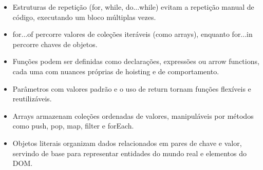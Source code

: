 \begin{itemize}
  \item Estruturas de repetição (for, while, do...while) evitam a repetição manual de código, executando um bloco múltiplas vezes.
\end{itemize}

\begin{itemize}
  \item for...of percorre valores de coleções iteráveis (como arrays), enquanto for...in percorre chaves de objetos.
\end{itemize}

\begin{itemize}
  \item Funções podem ser definidas como declarações, expressões ou arrow functions, cada uma com nuances próprias de hoisting e de comportamento.
\end{itemize}

\begin{itemize}
  \item Parâmetros com valores padrão e o uso de return tornam funções flexíveis e reutilizáveis.
\end{itemize}

\begin{itemize}
  \item Arrays armazenam coleções ordenadas de valores, manipuláveis por métodos como push, pop, map, filter e forEach.
\end{itemize}

\begin{itemize}
  \item Objetos literais organizam dados relacionados em pares de chave e valor, servindo de base para representar entidades do mundo real e elementos do DOM.
\end{itemize}
